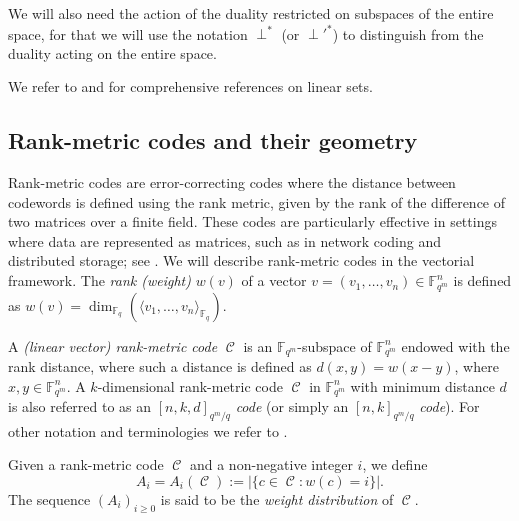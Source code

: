 \documentclass[11pt]{amsart}
\DeclareMathOperator{\C}{\mathcal{C}}
\theoremstyle{definition}
\newcommand{\F}{{\mathbb F}}
\newcommand{\fq}{{\mathbb F}_{q}}
\begin{document}
We will also need the action of the duality restricted on subspaces of the entire space, for that we will use the notation $\perp^*$ (or $\perp'^*$) to distinguish from the duality acting on the entire space.

We refer to \cite{lavrauw2015field} and \cite{polverino2010linear} for comprehensive references on linear sets.


\subsection{Rank-metric codes and their geometry}

Rank-metric codes are error-correcting codes where the distance between codewords is defined using the rank metric, given by the rank of the difference of two matrices over a finite field. These codes are particularly effective in settings where data are represented as matrices, such as in network coding and distributed storage; see \cite{bartz2022rank,gorla2021rank}.
We will describe rank-metric codes in the vectorial framework.
The \emph{rank (weight)} $w(v)$ of a vector $v=(v_1,\ldots,v_n) \in \F_{q^m}^n$ is defined as $w(v)=\dim_{\fq} (\langle v_1,\ldots, v_n\rangle_{\fq})$. 

A \emph{(linear vector) rank-metric code} $\C $ is an $\F_{q^m}$-subspace of $\F_{q^m}^n$ endowed with the rank distance, where such a distance is defined as $d(x,y)=w(x-y)$, where $x, y \in \F_{q^m}^n$. 
A $k$-dimensional rank-metric code $\C$ in $\F_{q^m}^n$ with minimum distance $d$ is also referred to as an $[n, k, d]_{q^m/q}$ \emph{code} (or simply an $[n, k]_{q^m/q}$ \emph{code}).
For other notation and terminologies we refer to \cite{alfarano2022linear,Randrianarisoa2020ageometric,sheekey2016new}.

Given a rank-metric code $\C$ and a non-negative integer $i$, we define \[
A_i=A_i (\C):=\lvert \{c \in \C \colon w(c)=i\} \rvert.\]
The sequence $(A_i)_{i\geq 0}$ is said to be the \emph{weight distribution} of $\C$.



\end{document}
